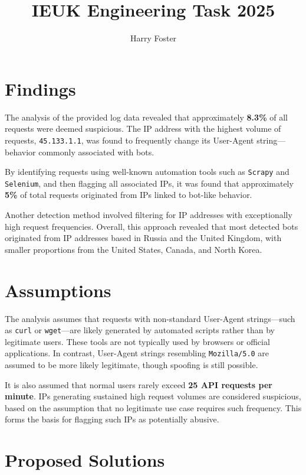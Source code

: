 \documentclass{article}
\title{IEUK Engineering Task 2025}
\author{Harry Foster}
\theoremstyle{mytheoremstyle}
\theoremstyle{mytheoremstyle}
\theoremstyle{myproblemstyle}
\begin{document}
\maketitle

\section{Findings}

The analysis of the provided log data revealed that approximately \textbf{8.3\%} of all requests were deemed suspicious. The IP address with the highest volume of requests, \texttt{45.133.1.1}, was found to frequently change its User-Agent string—behavior commonly associated with bots. 

By identifying requests using well-known automation tools such as \texttt{Scrapy} and \texttt{Selenium}, and then flagging all associated IPs, it was found that approximately \textbf{5\%} of total requests originated from IPs linked to bot-like behavior.

Another detection method involved filtering for IP addresses with exceptionally high request frequencies.
Overall, this approach revealed that most detected bots originated from IP addresses based in Russia and the United Kingdom, with smaller proportions from the United States, Canada, and North Korea.

\section{Assumptions}

The analysis assumes that requests with non-standard User-Agent strings—such as \texttt{curl} or \texttt{wget}—are likely generated by automated scripts rather than by legitimate users. These tools are not typically used by browsers or official applications. In contrast, User-Agent strings resembling \texttt{Mozilla/5.0} are assumed to be more likely legitimate, though spoofing is still possible.

It is also assumed that normal users rarely exceed \textbf{25 API requests per minute}. IPs generating sustained high request volumes are considered suspicious, based on the assumption that no legitimate use case requires such frequency. This forms the basis for flagging such IPs as potentially abusive.

\section{Proposed Solutions}
\end{document}
